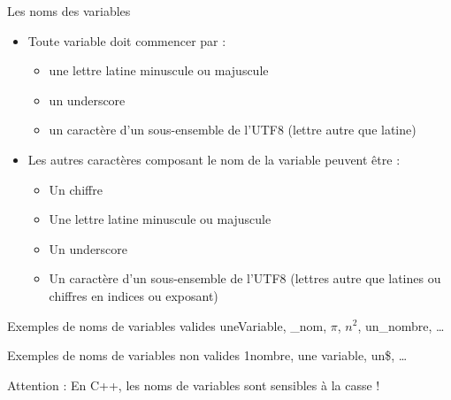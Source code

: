 \documentclass[compress,10pt,aspectratio=169]{beamer}
\begin{document}
\begin{frame}{Les noms des variables}
    \scriptsize
    \begin{itemize}
    \item Toute variable doit commencer par : 
    \begin{itemize}
        \scriptsize
        \item une lettre latine minuscule ou majuscule
        \item un underscore
        \item un caractère d'un sous-ensemble de l'UTF8 (lettre autre que latine)
    \end{itemize} 
    \item Les autres caractères composant le nom de la variable peuvent être :
    \begin{itemize}
        \scriptsize
        \item Un chiffre
        \item Une lettre latine minuscule ou majuscule
        \item Un underscore
        \item Un caractère d'un sous-ensemble de l'UTF8 (lettres autre que latines ou chiffres en indices ou exposant)
    \end{itemize}
\end{itemize}
\begin{multicols}{2}
\begin{exampleblock}{\scriptsize Exemples de noms de variables valides}
uneVariable, \_nom, $\pi$, $n^{2}$, un\_nombre, \ldots
\end{exampleblock}

\begin{alertblock}{\scriptsize Exemples de noms de variables non valides}
1nombre, une variable, un\$, \ldots
\end{alertblock}
\end{multicols}
\alert{Attention} : En C++, les noms de variables sont sensibles à la casse !
\end{frame}
\end{document}
